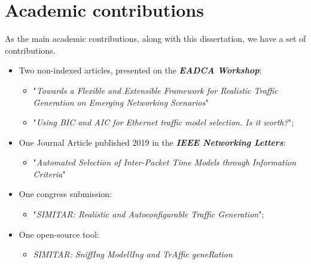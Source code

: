 \chapter{Academic contributions}
\label{ap:publications}

As the main academic contributions, along with this dissertation, we have a set of contributions. 
\begin{itemize}
    \item Two non-indexed articles, presented on the \textit{\textbf{EADCA Workshop}}:
        \begin{itemize}
        \item "\textit{Towards a Flexible and Extensible Framework for Realistic Traffic
        Generation on Emerging Networking Scenarios}"\cite{eadca-demo}
        \item "\textit{Using BIC and AIC for Ethernet traffic model selection. Is it worth?}"\cite{eadca-aic-bic};
        \end{itemize}
    
    \item One Journal Article published 2019 in the \textit{\textbf{IEEE Networking Letters}}:
        \begin{itemize}
        \item "\textit{Automated Selection of Inter-Packet Time Models through Information Criteria}"\cite{aic-bic-paper}
        \end{itemize}
    \item One congress submission:
        \begin{itemize}
        \item  "\textit{SIMITAR: Realistic and Autoconfigurable Traffic Generation}";
        \end{itemize}
    \item One open-source tool: 
        \begin{itemize}
        \item \textit{SIMITAR: SniffIng ModellIng and TrAffic geneRation}\cite{projeto-github}
        \end{itemize}
\end{itemize}








%

%


